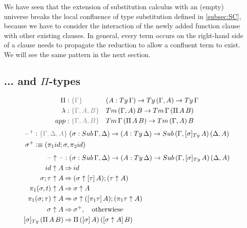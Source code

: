 \documentclass[a4paper,UKenglish,numberwithinsect,cleveref,thm-restate]{lipics-v2021}
\begin{document}
We have seen that the extension of substitution calculus with an (empty) universe breaks the local confluence of type substitution defined in \cref{subsec:SC}, because we have to consider the interaction of the newly added function clause with other existing clauses. 
In general, every term occurs on the right-hand side of a clause needs to propagate the reduction to allow a confluent term to exist.
We will see the same pattern in the next section. 
\subsection{... and \texorpdfstring{$\Pi$}{Π}-types} \label{subsec:SC+U+Pi}


\begin{alignat*}{3}
  \Pi     &: \implicit{\Gamma}            && (A : \Ty\,\Gamma) \to \Ty\,(\Gamma, A) \to \Ty\,\Gamma \\
  \lambda &: \implicit{\Gamma, A, B}      && \Tm\,(\Gamma, A)\,B \to \Tm\,\Gamma\,(\Pi\,A\,B) \\
  \mathsf{app} &: \implicit{\Gamma, A, B} && \Tm\,\Gamma\,(\Pi\,A\,B) \to \Tm\,(\Gamma, A)\,B \\
\end{alignat*}
\begin{alignat*}{3}
  \blank^+ & : \implicit{\Gamma, \Delta, A}\; (\sigma : \Sub\,\Gamma,\Delta) \to (A : \Ty\,\Delta) \to \Sub\,(\Gamma, [\sigma]_{\Ty}\,A)\, (\Delta, A) \\
  \sigma^+ & \defeq (\pi_1\idS ; \sigma, \pi_2\idS) \\
\end{alignat*}
\begin{alignat*}{3}
  \blank\uparrow \blank & : (\sigma : \Sub\,\Gamma,\Delta) \to (A : \Ty\,\Delta) \to \Sub\,(\Gamma, [\sigma]_{\Ty}\,A)\, (\Delta, A) \\
\idS                \uparrow A & \reduce \idS \\
\sigma ; \tau       \uparrow A & \reduce (\sigma \uparrow \sub{\tau}{A} ) ; (\tau \uparrow A) \\
\pi_1(\sigma, t)    \uparrow A & \reduce \sigma \uparrow A \\
\pi_1(\sigma; \tau) \uparrow A & \reduce \sigma \uparrow (\sub{\pi_1 \tau}{A}) ; (\pi_1 \tau \uparrow A) \\
\sigma              \uparrow A & \reduce \sigma^+ , \quad \text{otherwiese} \\
  [ \sigma ]_{\Ty}\,(\Pi\,A\,B) & \reduce \Pi\,(\sub{\sigma}{A})\,(\sub{\sigma\uparrow A}{B})
\end{alignat*}
\end{document}
